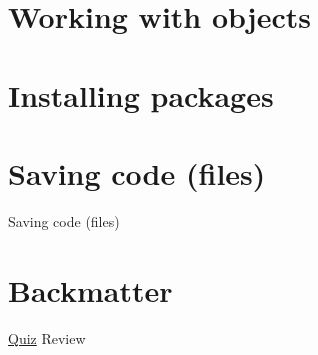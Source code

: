 \documentclass[
  11pt,
  ignorenonframetext,
]{beamer}
\begin{document}
\hypertarget{working-with-objects}{%
\section{Working with objects}\label{working-with-objects}}

\hypertarget{installing-packages}{%
\section{Installing packages}\label{installing-packages}}

\hypertarget{saving-code-files}{%
\section{Saving code (files)}\label{saving-code-files}}

\begin{frame}{Saving code (files)}
\end{frame}

\hypertarget{backmatter}{%
\section{Backmatter}\label{backmatter}}

\begin{frame}[fragile]{\protect\hyperlink{pop-quiz}{Quiz} Review}
\protect\hypertarget{quiz-review}{}
\end{frame}
\end{document}
